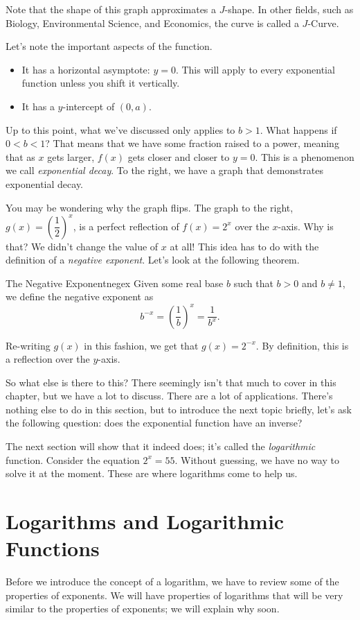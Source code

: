 \documentclass[lang=en,11pt]{elegantbook}
\begin{document}
Note that the shape of this graph approximates a $J$-shape.  In other fields, such as Biology, Environmental Science, and Economics, the curve is called a $J$-Curve.

Let's note the important aspects of the function.  \begin{itemize}
    \item It has a horizontal asymptote: $y = 0$.  This will apply to every exponential function unless you shift it vertically.
    \item It has a $y$-intercept of $(0,a)$.
\end{itemize}

\noindent Up to this point, what we've discussed only applies to $b>1$.  What happens if $0<b<1$?  That means that we have some fraction raised to a power, meaning that as $x$ gets larger, $f(x)$ gets closer and closer to $y=0$.  This is a phenomenon we call \textit{exponential decay}.  To the right, we have a graph that demonstrates exponential decay.  

You may be wondering why the graph flips.  The graph to the right, $g(x)=\left(\dfrac{1}{2}\right)^x$, is a perfect reflection of $f(x)=2^x$ over the $x$-axis.  Why is that?  We didn't change the value of $x$ at all!  This idea has to do with the definition of a \textit{negative exponent}.  Let's look at the following theorem.
\begin{definition}{The Negative Exponent}{negex}
Given some real base $b$ such that $b>0$ and $b\neq 1$, we define the negative exponent as $$b^{-x}=\left(\dfrac{1}{b}\right)^x=\dfrac{1}{b^x}.$$
\end{definition}
Re-writing $g(x)$ in this fashion, we get that $g(x)=2^{-x}$.  By definition, this is a reflection over the $y$-axis.

So what else is there to this?  There seemingly isn't that much to cover in this chapter, but we have a lot to discuss.  There are a lot of applications.  There's nothing else to do in this section, but to introduce the next topic briefly, let's ask the following question: does the exponential function have an inverse?

The next section will show that it indeed does; it's called the \textit{logarithmic} function.  Consider the equation $2^x=55$.  Without guessing, we have no way to solve it at the moment.  These are where logarithms come to help us.
\section{Logarithms and Logarithmic Functions}
\noindent Before we introduce the concept of a logarithm, we have to review some of the properties of exponents.  We will have properties of logarithms that will be very similar to the properties of exponents; we will explain why soon.
\end{document}
